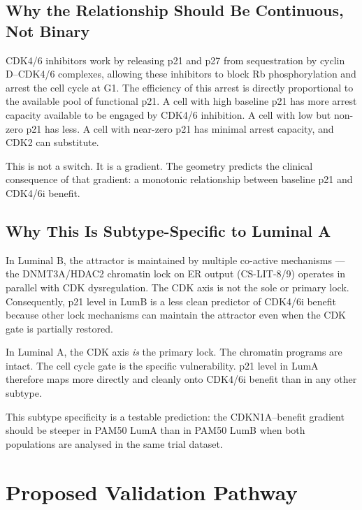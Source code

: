 \documentclass[12pt, a4paper]{article}
\begin{document}
\subsection{Why the Relationship Should Be Continuous,
Not Binary}

CDK4/6 inhibitors work by releasing p21 and p27 from
sequestration by cyclin D--CDK4/6 complexes, allowing
these inhibitors to block Rb phosphorylation and arrest
the cell cycle at G1. The efficiency of this arrest is
directly proportional to the available pool of functional
p21. A cell with high baseline p21 has more arrest
capacity available to be engaged by CDK4/6 inhibition.
A cell with low but non-zero p21 has less. A cell with
near-zero p21 has minimal arrest capacity, and CDK2
can substitute.

This is not a switch. It is a gradient. The geometry
predicts the clinical consequence of that gradient:
a monotonic relationship between baseline p21 and
CDK4/6i benefit.

\subsection{Why This Is Subtype-Specific to Luminal A}

In Luminal B, the attractor is maintained by multiple
co-active mechanisms --- the DNMT3A/HDAC2 chromatin lock
on ER output (CS-LIT-8/9) operates in parallel with CDK
dysregulation. The CDK axis is not the sole or primary
lock. Consequently, p21 level in LumB is a less clean
predictor of CDK4/6i benefit because other lock
mechanisms can maintain the attractor even when the
CDK gate is partially restored.

In Luminal A, the CDK axis \emph{is} the primary lock.
The chromatin programs are intact. The cell cycle gate is
the specific vulnerability. p21 level in LumA therefore
maps more directly and cleanly onto CDK4/6i benefit
than in any other subtype.

This subtype specificity is a testable prediction:
the CDKN1A--benefit gradient should be steeper in
PAM50 LumA than in PAM50 LumB when both populations
are analysed in the same trial dataset.

\section{Proposed Validation Pathway}
\end{document}
